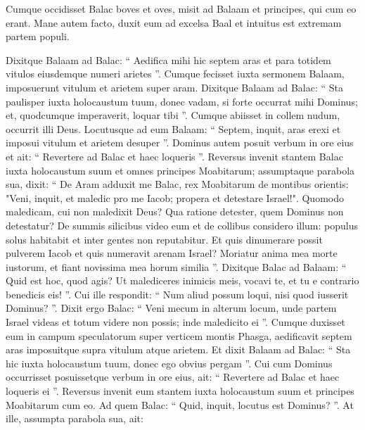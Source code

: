 \begin{biblechapter}
\begin{biblechapter}
\begin{biblechapter}
\begin{biblechapter}
\begin{biblechapter}
\begin{biblechapter}
\begin{biblechapter}
\begin{biblechapter}
\begin{biblechapter}
\begin{biblechapter}
\begin{biblechapter}
\begin{biblechapter}
\begin{biblechapter}
\begin{biblechapter}
\begin{biblechapter}
\begin{biblechapter}
\begin{biblechapter}
\begin{biblechapter}
\begin{biblechapter}
\begin{biblechapter}
\begin{biblechapter}
\begin{biblechapter}
\verse Cumque occidisset Balac boves et oves, misit ad Balaam et principes, qui cum eo erant.
 \verse Mane autem facto, duxit eum ad excelsa Baal et intuitus est extremam partem populi.
 
\begin{biblechapter}
\verse Dixitque Balaam ad Balac: “ Aedifica mihi hic septem aras et para totidem vitulos eiusdemque numeri arietes ”. 
\verse Cumque fecisset iuxta sermonem Balaam, imposuerunt vitulum et arietem super aram. 
\verse Dixitque Balaam ad Balac: “ Sta paulisper iuxta holocaustum tuum, donec vadam, si forte occurrat mihi Dominus; et, quodcumque imperaverit, loquar tibi ”. Cumque abiisset in collem nudum, 
\verse occurrit illi Deus. Locutusque ad eum Balaam: “ Septem, inquit, aras erexi et imposui vitulum et arietem desuper ”. 
\verse Dominus autem posuit verbum in ore eius et ait: “ Revertere ad Balac et haec loqueris ”. 
\verse Reversus invenit stantem Balac iuxta holocaustum suum et omnes principes Moabitarum; 
\verse assumptaque parabola sua, dixit:
 “ De Aram adduxit me Balac,
 rex Moabitarum de montibus orientis:
 "Veni, inquit, et maledic pro me Iacob;
 propera et detestare Israel!".
 \verse Quomodo maledicam, cui non maledixit Deus?
 Qua ratione detester, quem Dominus non detestatur?
 \verse De summis silicibus video eum
 et de collibus considero illum:
 populus solus habitabit
 et inter gentes non reputabitur.
 \verse Et quis dinumerare possit pulverem Iacob
 et quis numeravit arenam Israel?
 Moriatur anima mea morte iustorum,
 et fiant novissima mea horum similia ”.
 \verse Dixitque Balac ad Balaam: “ Quid est hoc, quod agis? Ut malediceres inimicis meis, vocavi te, et tu e contrario benedicis eis! ”. 
\verse Cui ille respondit: “ Num aliud possum loqui, nisi quod iusserit Dominus? ”. 
\verse Dixit ergo Balac: “ Veni mecum in alterum locum, unde partem Israel videas et totum videre non possis; inde maledicito ei ”. 
\verse Cumque duxisset eum in campum speculatorum super verticem montis Phasga, aedificavit septem aras imposuitque supra vitulum atque arietem. 
\verse Et dixit Balaam ad Balac: “ Sta hic iuxta holocaustum tuum, donec ego obvius pergam ”. 
\verse Cui cum Dominus occurrisset posuissetque verbum in ore eius, ait: “ Revertere ad Balac et haec loqueris ei ”. 
\verse Reversus invenit eum stantem iuxta holocaustum suum et principes Moabitarum cum eo. Ad quem Balac: “ Quid, inquit, locutus est Dominus? ”. 
\verse At ille, assumpta parabola sua, ait:

\end{biblechapter}
\end{biblechapter}
\end{biblechapter}
\end{biblechapter}
\end{biblechapter}
\end{biblechapter}
\end{biblechapter}
\end{biblechapter}
\end{biblechapter}
\end{biblechapter}
\end{biblechapter}
\end{biblechapter}
\end{biblechapter}
\end{biblechapter}
\end{biblechapter}
\end{biblechapter}
\end{biblechapter}
\end{biblechapter}
\end{biblechapter}
\end{biblechapter}
\end{biblechapter}
\end{biblechapter}
\end{biblechapter}

